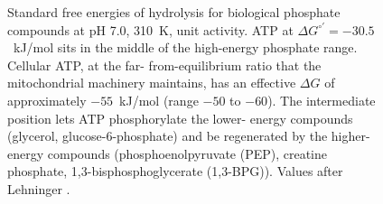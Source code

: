 \begin{figure}[htbp]
\centering
{}
\caption[ATP hydrolysis in context]{Standard free energies of
hydrolysis for biological phosphate compounds at pH 7.0, 310~K, unit
activity. ATP at $\Delta G^{\circ\prime} = -30.5$~kJ/mol sits in the
middle of the high-energy phosphate range. Cellular ATP, at the far-
from-equilibrium ratio that the mitochondrial machinery maintains, has
an effective $\Delta G$ of approximately $-55$~kJ/mol (range $-50$ to
$-60$). The intermediate position lets ATP phosphorylate the lower-
energy compounds (glycerol, glucose-6-phosphate) and be regenerated by
the higher-energy compounds (phosphoenolpyruvate (PEP), creatine
phosphate, 1,3-bisphosphoglycerate (1,3-BPG)). Values after Lehninger
\cite[table~13.1]{text:lehninger-biochemistry}.}
\label{fig:vol06:ch02:atp-bar}
\end{figure}
